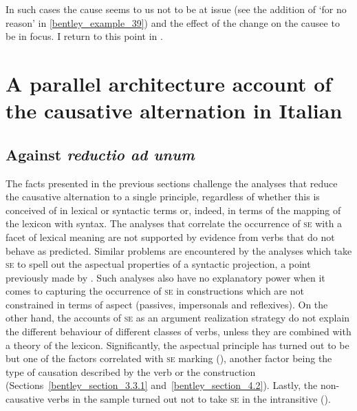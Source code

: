\documentclass[output=paper,colorlinks,citecolor=brown
]{langscibook}
\begin{document}
In such cases the cause seems to us not to be at issue (see the addition of ‘for no reason’ in \ref{bentley_example_39}) and the effect of the change on the causee to be in focus. I return to this point in .

\section{A parallel architecture account of the causative alternation in Italian}
\label{bentley_section_5}

\subsection{Against \textit{reductio ad unum}}
\label{bentley_section_5.1}

The facts presented in the previous sections challenge the analyses that reduce the causative alternation to a single principle, regardless of whether this is conceived of in lexical or syntactic terms or, indeed, in terms of the mapping of the lexicon with syntax. The analyses that correlate the occurrence of \textsc{se} with a facet of lexical meaning are not supported by evidence from verbs that do not behave as predicted. Similar problems are encountered by the analyses which take \textsc{se} to spell out the aspectual properties of a syntactic projection, a point previously made by \citet[82--88]{alexiadou2015external}. Such analyses also have no explanatory power when it comes to capturing the occurrence of \textsc{se} in constructions which are not constrained in terms of aspect (passives, impersonals and reflexives). On the other hand, the accounts of \textsc{se} as an argument realization strategy do not explain the different behaviour of different classes of verbs, unless they are combined with a theory of the lexicon. Significantly, the aspectual principle has turned out to be but one of the factors correlated with \textsc{se} marking (), another factor being the type of causation described by the verb or the construction (Sections~\ref{bentley_section_3.3.1} and~\ref{bentley_section_4.2}). Lastly, the non-causative verbs in the sample turned out not to take \textsc{se} in the intransitive (). 
\end{document}
